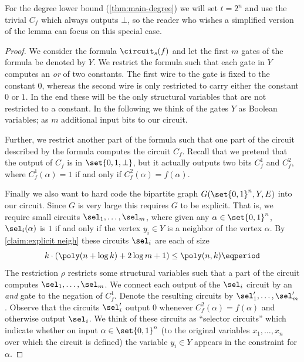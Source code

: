 For the degree lower bound (\cref{thm:main-degree}) we will set $t =
2^n$ and use the trivial $C_f$ which always outputs $\bot$, so the
reader who wishes a simplified version of the lemma can focus on this
special case.

\begin{proof}
  We consider the formula $\circuit_s(f)$ and let the first $m$ gates
  of the formula be denoted by $Y$. We restrict the formula such that
  each gate in $Y$ computes an \emph{or} of two constants. The first
  wire to the gate is fixed to the constant $0$, whereas the second
  wire is only restricted to carry either the constant $0$ or $1$.  In
  the end these will be the only structural variables that are not
  restricted to a constant. In the following we think of the gates $Y$
  as Boolean variables; as $m$ additional input bits to our circuit.

  Further, we restrict another part of the formula such that one part
  of the circuit described by the formula computes the circuit
  $C_f$. Recall that we pretend that the output of $C_f$ is in
  $\set{0,1,\bot}$, but it actually outputs two bits $C_f^1$ and
  $C_f^2$, where $C_f^1(\alpha) = 1$ if and only
  if $C_f^2(\alpha) = f(\alpha)$.

  Finally we also want to hard code the bipartite graph
  $G(\set{0,1}^n, Y, E)$ into our circuit. Since $G$ is very large
  this requires $G$ to be explicit. That is, we require small circuits
  $\sel_1, \ldots, \sel_{m}$, where given any $\alpha \in \set{0,1}^n$, $\sel_i(\alpha)$ is $1$ if and only if the vertex $y_i \in Y$ is a
  neighbor of the vertex $\alpha$.
  By \cref{claim:explicit neigh} these circuits $\sel_i$ are each of size
  \[
    k \cdot \left( \poly(n + \log k) + 2 \log m + 1 \right)
    \le \poly(n, k) \eqperiod
  \]
  The restriction $\rho$ restricts some structural variables such that
  a part of the circuit computes $\sel_1, \ldots, \sel_m$. We connect
  each output of the $\sel_i$ circuit by an \emph{and} gate to the
  negation of $C_f^1$. Denote the resulting circuits by
  $\sel'_1, \ldots, \sel'_m$.  Observe that the circuits $\sel_i'$
  output $0$ whenever $C_f^2(\alpha) = f(\alpha)$ and otherwise output
  $\sel_i$. We think of these circuits as ``selector circuits'' which
  indicate whether on input $\alpha \in \set{0,1}^n$ (to the original
  variables $x_1,\ldots, x_n$ over which the circuit is defined) the
  variable $y_i \in Y$ appears in the constraint for $\alpha$.


\end{proof}
